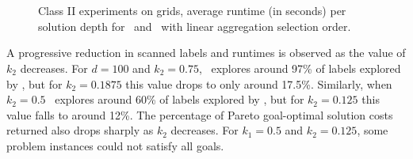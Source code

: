 \begin{figure}
    \begin{center}
%
      \\ %
\vspace{0.025\textwidth}      
		\\ %
    \end{center}
    \vspace{-0.25in} 
    \caption{%
Class II experiments on grids, average runtime (in seconds) per solution depth for \lexgo \ and \namoa \ with linear aggregation selection order. 
    }%
    \label{fig:6-6}
\end{figure}

A progressive reduction in scanned labels and runtimes is observed as the value of $k_2$ decreases. For $d=100$ and $k_2=0.75$, \lexgo \ explores around 97\% of labels explored by \namoa, but for $k_2=0.1875$ this value drops to only around 17.5\%. Similarly, when $k_2=0.5$ \ \lexgo explores around 60\% of labels explored by \namoa, but for $k_2=0.125$ this value falls to around 12\%. The percentage of Pareto goal-optimal solution costs returned also drops sharply as $k_2$ decreases. For $k_1=0.5$ and $k_2=0.125$, some problem instances could not satisfy all goals. 

